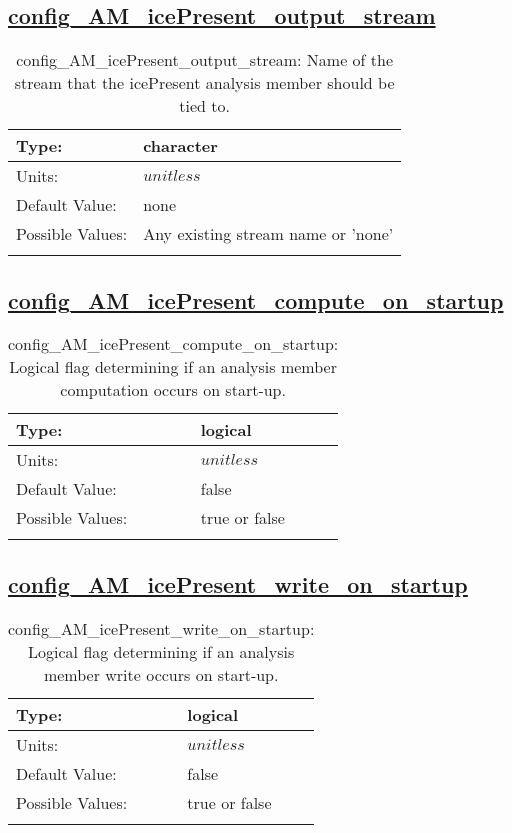 \subsection[config\_AM\_icePresent\_output\_stream]{\hyperref[sec:nm_tab_AM_icePresent]{config\_AM\_icePresent\_output\_stream}}
\label{subsec:nm_sec_config_AM_icePresent_output_stream}
\begin{center}
\begin{longtable}{| p{2.0in} || p{4.0in} |}
    \hline
    Type: & character \\
    \hline
    Units: & $unitless$ \\
    \hline
    Default Value: & none \\
    \hline
    Possible Values: & Any existing stream name or 'none' \\
    \hline
    \caption{config\_AM\_icePresent\_output\_stream: Name of the stream that the icePresent analysis member should be tied to.}
\end{longtable}
\end{center}
\subsection[config\_AM\_icePresent\_compute\_on\_startup]{\hyperref[sec:nm_tab_AM_icePresent]{config\_AM\_icePresent\_compute\_on\_startup}}
\label{subsec:nm_sec_config_AM_icePresent_compute_on_startup}
\begin{center}
\begin{longtable}{| p{2.0in} || p{4.0in} |}
    \hline
    Type: & logical \\
    \hline
    Units: & $unitless$ \\
    \hline
    Default Value: & false \\
    \hline
    Possible Values: & true or false \\
    \hline
    \caption{config\_AM\_icePresent\_compute\_on\_startup: Logical flag determining if an analysis member computation occurs on start-up.}
\end{longtable}
\end{center}
\subsection[config\_AM\_icePresent\_write\_on\_startup]{\hyperref[sec:nm_tab_AM_icePresent]{config\_AM\_icePresent\_write\_on\_startup}}
\label{subsec:nm_sec_config_AM_icePresent_write_on_startup}
\begin{center}
\begin{longtable}{| p{2.0in} || p{4.0in} |}
    \hline
    Type: & logical \\
    \hline
    Units: & $unitless$ \\
    \hline
    Default Value: & false \\
    \hline
    Possible Values: & true or false \\
    \hline
    \caption{config\_AM\_icePresent\_write\_on\_startup: Logical flag determining if an analysis member write occurs on start-up.}
\end{longtable}
\end{center}
